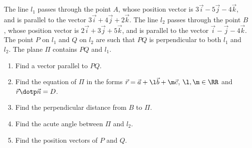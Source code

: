\begin{problem}
    The line $l_1$ passes through the point $A$, whose position vector is $3\vec i -5\vec j -4\vec k$, and is parallel to the vector $3\vec i + 4\vec j + 2\vec k$. The line $l_2$ passes through the point $B$, whose position vector is $2\vec i + 3\vec j + 5\vec k$, and is parallel to the vector $\vec i - \vec j - 4\vec k$. The point $P$ on $l_1$ and $Q$ on $l_2$ are such that $PQ$ is perpendicular to both $l_1$ and $l_2$. The plane $\Pi$ contains $PQ$ and $l_1$.

    \begin{enumerate}
        \item Find a vector parallel to $PQ$.
        \item Find the equation of $\Pi$ in the forms $\vec r = \vec a + \l \vec b + \m \vec c$, $\l, \m \in \RR$ and $\vec r \dotp \vec n = D$.
        \item Find the perpendicular distance from $B$ to $\Pi$.
        \item Find the acute angle between $\Pi$ and $l_2$.
        \item Find the position vectors of $P$ and $Q$.
    \end{enumerate}
\end{problem}
